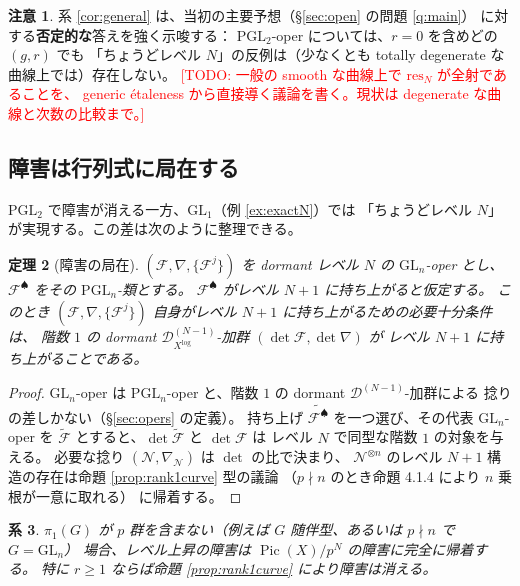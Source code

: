\documentclass[a4paper,11pt]{ltjsarticle}
\theoremstyle{plain}
\newtheorem{theorem}{定理}[section]
\newtheorem{corollary}[theorem]{系}
\theoremstyle{definition}
\newtheorem{remark}[theorem]{注意}
\newcommand{\Todo}[1]{\textcolor{red}{\textsf{[TODO: #1]}}}
\newcommand{\cD}{\mathcal{D}}
\newcommand{\cF}{\mathcal{F}}
\newcommand{\cN}{\mathcal{N}}
\newcommand{\Pic}{\operatorname{Pic}}
\newcommand{\Dlog}[1]{\cD^{(#1)}_{X^{\log}}}
\begin{document}
\begin{remark}\label{rem:no-pgl2-cex}
系 \ref{cor:general} は、当初の主要予想（\S\ref{sec:open} の問題 \ref{q:main}）
に対する\textbf{否定的な}答えを強く示唆する：
$\mathrm{PGL}_2$-oper については、$r=0$ を含めどの $(g,r)$ でも
「ちょうどレベル $N$」の反例は（少なくとも totally degenerate な曲線上では）存在しない。
\Todo{一般の smooth な曲線上で $\mathrm{res}_N$ が全射であることを、
generic étaleness から直接導く議論を書く。現状は degenerate な曲線と次数の比較まで。}
\end{remark}

\subsection{障害は行列式に局在する}

$\mathrm{PGL}_2$ で障害が消える一方、$\mathrm{GL}_1$（例 \ref{ex:exactN}）では
「ちょうどレベル $N$」が実現する。この差は次のように整理できる。

\begin{theorem}[障害の局在]\label{thm:det}
$(\cF,\nabla,\{\cF^j\})$ を dormant レベル $N$ の $\mathrm{GL}_n$-oper とし、
$\mathscr{F}^{\spadesuit}$ をその $\mathrm{PGL}_n$-類とする。
$\mathscr{F}^{\spadesuit}$ がレベル $N+1$ に持ち上がると仮定する。
このとき $(\cF,\nabla,\{\cF^j\})$ 自身がレベル $N+1$ に持ち上がるための必要十分条件は、
階数 $1$ の dormant $\Dlog{N-1}$-加群 $(\det\cF,\det\nabla)$ が
レベル $N+1$ に持ち上がることである。
\end{theorem}

\begin{proof}
$\mathrm{GL}_n$-oper は $\mathrm{PGL}_n$-oper と、階数 $1$ の dormant $\cD^{(N-1)}$-加群による
捻りの差しかない（\S\ref{sec:opers} の定義）。
持ち上げ $\widetilde{\mathscr{F}^{\spadesuit}}$ を一つ選び、その代表 $\mathrm{GL}_n$-oper を
$\widetilde{\cF}$ とすると、$\det\widetilde{\cF}$ と $\det\cF$ は
レベル $N$ で同型な階数 $1$ の対象を与える。
必要な捻り $(\cN,\nabla_\cN)$ は $\det$ の比で決まり、
$\cN^{\otimes n}$ のレベル $N+1$ 構造の存在は命題 \ref{prop:rank1curve} 型の議論
（$p\nmid n$ のとき命題 4.1.4 \cite{Wak} により $n$ 乗根が一意に取れる）
に帰着する。
\end{proof}

\begin{corollary}\label{cor:pi1}
$\pi_1(G)$ が $p$ 群を含まない（例えば $G$ 随伴型、あるいは $p\nmid n$ で $G=\mathrm{GL}_n$）
場合、レベル上昇の障害は $\Pic(X)/p^N$ の障害に完全に帰着する。
特に $r\ge1$ ならば命題 \ref{prop:rank1curve} により障害は消える。
\end{corollary}
\end{document}
